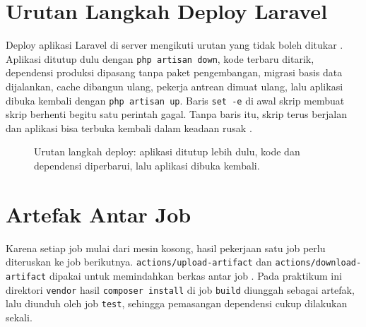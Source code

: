 \documentclass[a4paper,oneside,12pt]{report}
\begin{document}
\section{Urutan Langkah Deploy Laravel}
Deploy aplikasi Laravel di server mengikuti urutan yang tidak boleh ditukar \cite{laravel-docs}. Aplikasi ditutup dulu dengan \texttt{php artisan down}, kode terbaru ditarik, dependensi produksi dipasang tanpa paket pengembangan, migrasi basis data dijalankan, cache dibangun ulang, pekerja antrean dimuat ulang, lalu aplikasi dibuka kembali dengan \texttt{php artisan up}. Baris \texttt{set -e} di awal skrip membuat skrip berhenti begitu satu perintah gagal. Tanpa baris itu, skrip terus berjalan dan aplikasi bisa terbuka kembali dalam keadaan rusak \cite{stauffer2023}.

\begin{figure}[H]
    \centering
    \caption{Urutan langkah deploy: aplikasi ditutup lebih dulu, kode dan dependensi diperbarui, lalu aplikasi dibuka kembali.}
    \label{fig:deploy-order}
\end{figure}

\section{Artefak Antar Job}
Karena setiap job mulai dari mesin kosong, hasil pekerjaan satu job perlu diteruskan ke job berikutnya. \texttt{actions/upload-artifact} dan \texttt{actions/download-artifact} dipakai untuk memindahkan berkas antar job \cite{github-artifacts}. Pada praktikum ini direktori \texttt{vendor} hasil \texttt{composer install} di job \texttt{build} diunggah sebagai artefak, lalu diunduh oleh job \texttt{test}, sehingga pemasangan dependensi cukup dilakukan sekali.
\end{document}

